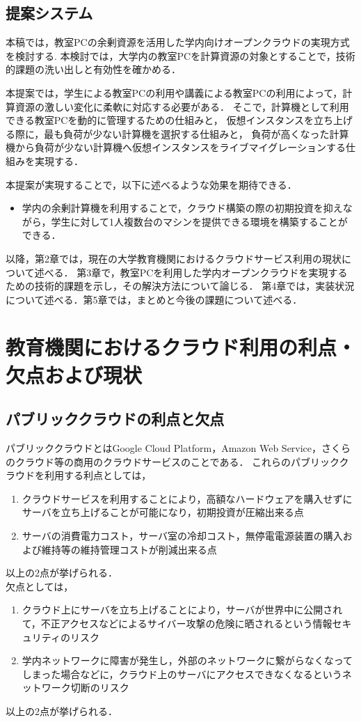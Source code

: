 \documentclass[11pt,a4paper]{jsarticle}
\begin{document}
\subsection{提案システム}
本稿では，教室PCの余剰資源を活用した学内向けオープンクラウドの実現方式を検討する.
本検討では，大学内の教室PCを計算資源の対象とすることで，技術的課題の洗い出しと有効性を確かめる．
\par 本提案では，学生による教室PCの利用や講義による教室PCの利用によって，計算資源の激しい変化に柔軟に対応する必要がある．
そこで，計算機として利用できる教室PCを動的に管理するための仕組みと，
仮想インスタンスを立ち上げる際に，最も負荷が少ない計算機を選択する仕組みと，
負荷が高くなった計算機から負荷が少ない計算機へ仮想インスタンスをライブマイグレーションする仕組みを実現する．
\par 本提案が実現することで，以下に述べるような効果を期待できる．
\begin{itemize}
	\item 学内の余剰計算機を利用することで，クラウド構築の際の初期投資を抑えながら，学生に対して1人複数台のマシンを提供できる環境を構築することができる．
\end{itemize}

\par 以降，第2章では，現在の大学教育機関におけるクラウドサービス利用の現状について述べる．
第3章で，教室PCを利用した学内オープンクラウドを実現するための技術的課題を示し，その解決方法について論じる．
第4章では，実装状況について述べる．第5章では，まとめと今後の課題について述べる．

\section{教育機関におけるクラウド利用の利点・欠点および現状}
\subsection{パブリッククラウドの利点と欠点}
パブリッククラウドとはGoogle Cloud Platform，Amazon Web Service，さくらのクラウド等の商用のクラウドサービスのことである．
これらのパブリッククラウドを利用する利点としては，
\begin{enumerate}
	\item クラウドサービスを利用することにより，高額なハードウェアを購入せずにサーバを立ち上げることが可能になり，初期投資が圧縮出来る点
	\item サーバの消費電力コスト，サーバ室の冷却コスト，無停電電源装置の購入および維持等の維持管理コストが削減出来る点
\end{enumerate}
以上の2点が挙げられる．
\\ 欠点としては，
\begin{enumerate}
	\item クラウド上にサーバを立ち上げることにより，サーバが世界中に公開されて，不正アクセスなどによるサイバー攻撃の危険に晒されるという情報セキュリティのリスク
	\item 学内ネットワークに障害が発生し，外部のネットワークに繋がらなくなってしまった場合などに，クラウド上のサーバにアクセスできなくなるというネットワーク切断のリスク
\end{enumerate}
以上の2点が挙げられる．
\end{document}
